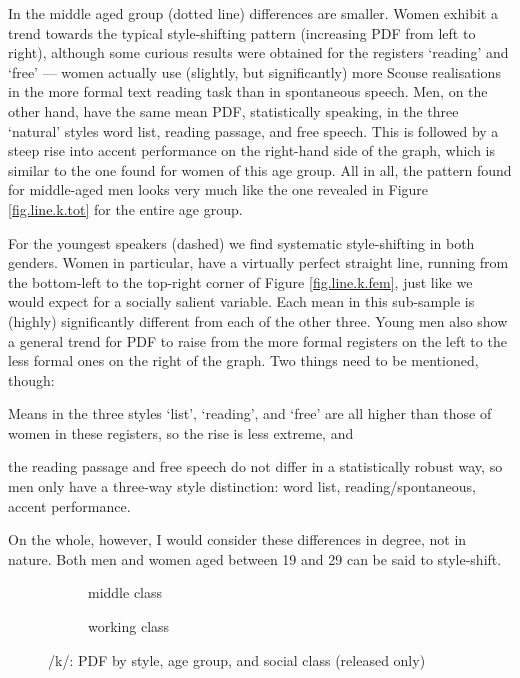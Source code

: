 In the middle aged group (dotted line) differences are smaller.
Women exhibit a trend towards the typical style-shifting pattern (increasing PDF from left to right), although some curious results were obtained for the registers `reading' and `free' --- women actually use (slightly, but significantly) more Scouse realisations in the more formal text reading task than in spontaneous speech.
Men, on the other hand, have the same mean PDF, statistically speaking, in the three `natural' styles word list, reading passage, and free speech.
This is followed by a steep rise into accent performance on the right-hand side of the graph, which is similar to the one found for women of this age group.
All in all, the pattern found for middle-aged men looks very much like the one revealed in Figure \ref{fig.line.k.tot} for the entire age group.

For the youngest speakers (dashed) we find systematic style-shifting in both genders.
Women in particular, have a virtually perfect straight line, running from the bottom-left to the top-right corner of Figure \ref{fig.line.k.fem}, just like we would expect for a socially salient variable.
Each mean in this sub-sample is (highly) significantly different from each of the other three.
Young men also show a general trend for PDF to raise from the more formal registers on the left to the less formal ones on the right of the graph.
Two things need to be mentioned, though:
\begin{inparaenum}[(1)]
	\item Means in the three styles `list', `reading', and `free' are all higher than those of women in these registers, so the rise is less extreme, and
	\item the reading passage and free speech do not differ in a statistically robust way, so men only have a three-way style distinction: word list, reading/spontaneous, accent performance.
\end{inparaenum}
On the whole, however, I would consider these differences in degree, not in nature.
Both men and women aged between 19 and 29 can be said to style-shift.

\begin{figure}[h]
	\centering
	\begin{subfigure}{.49\textwidth}
		\centering
			\resizebox{\linewidth}{!}{} 
		\caption{middle class}
		\label{fig.line.k.mc}
	\end{subfigure}
	\begin{subfigure}{.49\textwidth}
		\centering
			\resizebox{\linewidth}{!}{} 
		\caption{working class}
		\label{fig.line.k.wc}
	\end{subfigure}
	\caption{/k/: PDF by style, age group, and social class (released only)}
\end{figure}

